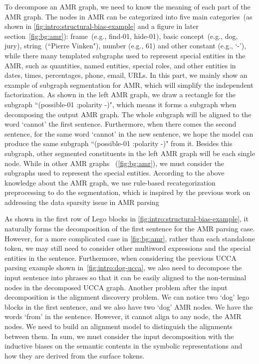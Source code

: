 { To decompose an AMR graph, we need to
know the meaning of each part of the AMR graph. The nodes in AMR can
be categorized into five main categories~(as shown in
\autoref{fig:intro:structural-bias-example} and a figure in later
section~\autoref{fig:bg:amr}): frame~(e.g., find-01, hide-01), basic
concept~(e.g., dog, jury), string~(``Pierre Vinken"), number (e.g.,
61) and other constant (e.g., `-'), while there many templated
subgraphs used to represent special entities in the AMR, such as
quantities, named entities, special roles, and other entities in
dates, times, percentages, phone, email, URLs. In this part, we mainly
show an example of subgraph segmentation for AMR, which will simplify
the independent factorization. As shown in the left AMR graph, we draw
a rectangle for the subgraph ``(possible-01 :polarity -)", which means
it forms a subgraph when decomposing the output AMR graph. The whole
subgraph will be aligned to the word `cannot' the first
sentence. Furthermore, when there comes the second sentence, for the
same word `cannot' in the new sentence, we hope the model can produce
the same subgraph ``(possible-01 :polarity -)" from it. Besides this
subgraph, other segmented constituents in the left AMR graph will be
each single node. While in other AMR graphs ~(\autoref{fig:bg:amr}),
we must consider the subgraphs used to represent the special
entities. According to the above knowledge about the AMR graph, we use
rule-based recategorization preprocessing to do the segmentation,
which is inspired by the previous work on addressing the data sparsity
issue in AMR
parsing~\citep{Werling:2015up,foland-martin-2017-abstract,Wang:2017vt,Peng:2017ud}

 As shown in
the first row of Lego blocks in
\autoref{fig:intro:structural-bias-example}, it naturally forms the
decomposition of the first sentence for the AMR parsing case. However,
for a more complicated case in \autoref{fig:bg:amr}, rather than each
standalone token, we may still need to consider other multiword
expressions and the special entities in the sentence. Furthermore,
when considering the previous UCCA parsing example shown
in~\autoref{fig:intro:dog-ucca}, we also need to decompose the input
sentence into phrases so that it can be easily aligned to the
non-terminal nodes in the decomposed UCCA graph.  Another problem
after the input decomposition is the alignment discovery problem. We
can notice two `dog' lego blocks in the first sentence, and we also
have two `dog' AMR nodes. We have the words `from' in the
sentence. However, it cannot align to any node, the AMR nodes. We need
to build an alignment model to distinguish the alignments between
them. In sum, we must consider the input decomposition with the
inductive biases on the semantic contents in the symbolic
representations and how they are derived from the surface tokens.

}
